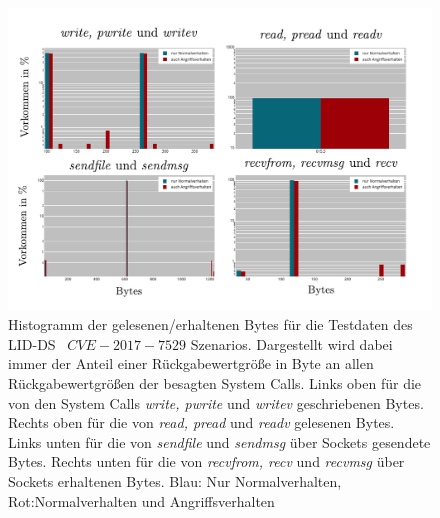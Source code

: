                     \begin{figure}[ht]
                        \centering
                        \includegraphics[width=\textwidth]{images/return_2017_plot.pdf}
                        \caption{Histogramm der gelesenen/erhaltenen Bytes für die Testdaten des \ac{LID-DS}~\cite{LID-DS} $CVE-2017-7529$ Szenarios.
                        Dargestellt wird dabei immer der Anteil einer Rückgabewertgröße in Byte an allen Rückgabewertgrößen der besagten System Calls.
                        Links oben für die von den System Calls \textit{write, pwrite} und \textit{writev} geschriebenen Bytes.
                        Rechts oben für die von \textit{read, pread} und \textit{readv} gelesenen Bytes.
                        Links unten für die von \textit{sendfile} und \textit{sendmsg} über Sockets gesendete Bytes.
                        Rechts unten für die von \textit{recvfrom, recv} und \textit{recvmsg} über Sockets erhaltenen Bytes.
                        Blau: Nur Normalverhalten, Rot:Normalverhalten und Angriffsverhalten}
                        \label{fig:return_values}
                    \end{figure}

